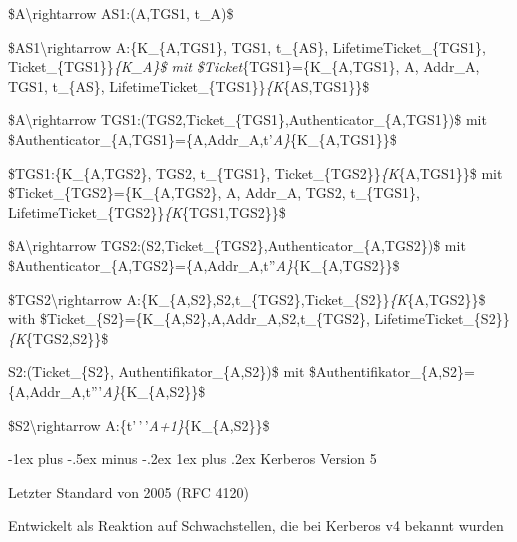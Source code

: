 \documentclass[a4paper]{article}
\makeatletter
\renewcommand{\subsubsection}{\@startsection{subsubsection}{3}{0mm}%
 {-1ex plus -.5ex minus -.2ex}%
 {1ex plus .2ex}%
 {\normalfont\small\bfseries}}
\makeatother
\begin{document}
\begin{multicols}{3}
\begin{itemize*}
            \begin{enumerate*}
                  \def\labelenumi{\arabic{enumi}.}
                  \item \$A\textbackslash rightarrow AS1:(A,TGS1, t\_A)\$
                  \item \$AS1\textbackslash rightarrow A:\{K\_\{A,TGS1\}, TGS1, t\_\{AS\}, LifetimeTicket\_\{TGS1\}, Ticket\_\{TGS1\}\}\emph{\{K\_A\}\$ mit \$Ticket}\{TGS1\}=\{K\_\{A,TGS1\}, A, Addr\_A, TGS1, t\_\{AS\}, LifetimeTicket\_\{TGS1\}\}\emph{\{K}\{AS,TGS1\}\}\$
                  \item \$A\textbackslash rightarrow TGS1:(TGS2,Ticket\_\{TGS1\},Authenticator\_\{A,TGS1\})\$ mit \$Authenticator\_\{A,TGS1\}=\{A,Addr\_A,t'\emph{A\}}\{K\_\{A,TGS1\}\}\$
                  \item \$TGS1:\{K\_\{A,TGS2\}, TGS2, t\_\{TGS1\}, Ticket\_\{TGS2\}\}\emph{\{K}\{A,TGS1\}\}\$ mit \$Ticket\_\{TGS2\}=\{K\_\{A,TGS2\}, A, Addr\_A, TGS2, t\_\{TGS1\}, LifetimeTicket\_\{TGS2\}\}\emph{\{K}\{TGS1,TGS2\}\}\$
                  \item \$A\textbackslash rightarrow TGS2:(S2,Ticket\_\{TGS2\},Authenticator\_\{A,TGS2\})\$ mit \$Authenticator\_\{A,TGS2\}=\{A,Addr\_A,t''\emph{A\}}\{K\_\{A,TGS2\}\}\$
                  \item \$TGS2\textbackslash rightarrow A:\{K\_\{A,S2\},S2,t\_\{TGS2\},Ticket\_\{S2\}\}\emph{\{K}\{A,TGS2\}\}\$ with \$Ticket\_\{S2\}=\{K\_\{A,S2\},A,Addr\_A,S2,t\_\{TGS2\}, LifetimeTicket\_\{S2\}\}\emph{\{K}\{TGS2,S2\}\}\$
                  \item S2:(Ticket\_\{S2\}, Authentifikator\_\{A,S2\})\$ mit \$Authentifikator\_\{A,S2\}=\{A,Addr\_A,t'''\emph{A\}}\{K\_\{A,S2\}\}\$
                  \item \$S2\textbackslash rightarrow A:\{t'\,'\,'\emph{A+1\}}\{K\_\{A,S2\}\}\$
            \end{enumerate*}
      \end{itemize*}


      \subsubsection{Kerberos Version 5}

      \begin{itemize*}
            \item
            Letzter Standard von 2005 (RFC 4120)
            \item
            Entwickelt als Reaktion auf Schwachstellen, die bei Kerberos v4
            bekannt wurden


\end{itemize*}
\end{multicols}
\end{document}
